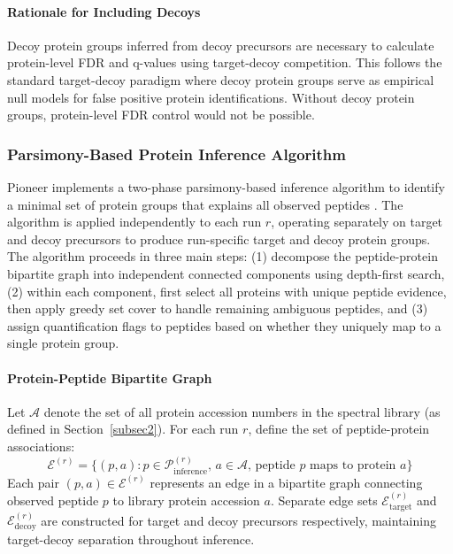 \documentclass[pdflatex,sn-nature]{sn-jnl}
\begin{document}
\paragraph{Rationale for Including Decoys} Decoy protein groups inferred from decoy precursors are necessary to calculate protein-level FDR and q-values using target-decoy competition. This follows the standard target-decoy paradigm where decoy protein groups serve as empirical null models for false positive protein identifications. Without decoy protein groups, protein-level FDR control would not be possible.

\subsubsection{Parsimony-Based Protein Inference Algorithm}

Pioneer implements a two-phase parsimony-based inference algorithm to identify a minimal set of protein groups that explains all observed peptides \cite{Nesvizhskii2005,Zhang2007}. The algorithm is applied independently to each run $r$, operating separately on target and decoy precursors to produce run-specific target and decoy protein groups. The algorithm proceeds in three main steps: (1) decompose the peptide-protein bipartite graph into independent connected components using depth-first search, (2) within each component, first select all proteins with unique peptide evidence, then apply greedy set cover to handle remaining ambiguous peptides, and (3) assign quantification flags to peptides based on whether they uniquely map to a single protein group.

\paragraph{Protein-Peptide Bipartite Graph} Let $\mathcal{A}$ denote the set of all protein accession numbers in the spectral library (as defined in Section~\ref{subsec2}). For each run $r$, define the set of peptide-protein associations:
\begin{equation}
\mathcal{E}^{(r)} = \{(p, a) : p \in \mathcal{P}_{\text{inference}}^{(r)}, \, a \in \mathcal{A}, \, \text{peptide } p \text{ maps to protein } a\}
\end{equation}
Each pair $(p, a) \in \mathcal{E}^{(r)}$ represents an edge in a bipartite graph connecting observed peptide $p$ to library protein accession $a$. Separate edge sets $\mathcal{E}_{\text{target}}^{(r)}$ and $\mathcal{E}_{\text{decoy}}^{(r)}$ are constructed for target and decoy precursors respectively, maintaining target-decoy separation throughout inference.
\end{document}
